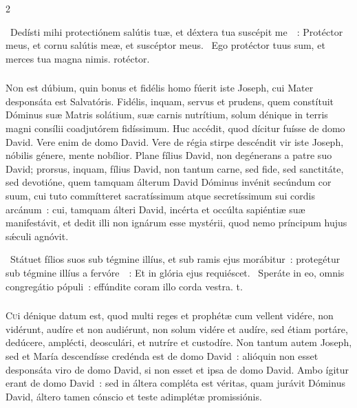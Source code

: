 \documentclass[9pt,twoside]{extarticle}
\begin{document}
\begin{multicols}{2}
{{\begin{tightlist}{}
\item {}~Dedísti mihi protectiónem salútis tuæ, et déxtera tua suscépit me~~: \textred{*} Protéctor meus, et cornu salútis meæ, et suscéptor meus. ~Ego protéctor tuus sum, et merces tua magna nimis. rotéctor.
\end{tightlist}

\subsubsection*{\center {}}
\lettrine{N}on est dúbium, quin bonus et fidélis homo fúerit iste Joseph, cui Mater desponsáta est Salvatóris. Fidélis, inquam, servus et prudens, quem constítuit Dóminus suæ Matris solátium, suæ carnis nutrítium, solum dénique in terris magni consílii coadjutórem fidíssimum. Huc accédit, quod dícitur fuísse de domo David. Vere enim de domo David. Vere de régia stirpe descéndit vir iste Joseph, nóbilis génere, mente nobílior. Plane fílius David, non degénerans a patre suo David; prorsus, inquam, fílius David, non tantum carne, sed fide, sed sanctitáte, sed devotióne, quem tamquam álterum David Dóminus invénit secúndum cor suum, cui tuto commítteret sacratíssimum atque secretíssimum sui cordis arcánum~: cui, tamquam álteri David, incérta et occúlta sapiéntiæ suæ manifestávit, et dedit illi non ignárum esse mystérii, quod nemo príncipum hujus sǽculi agnóvit.

\begin{tightlist}{}
\item {}~Státuet fílios suos sub tégmine illíus, et sub ramis ejus morábitur~: protegétur sub tégmine illíus a fervóre~~: \textred{*} Et in glória ejus requiéscet. ~Speráte in eo, omnis congregátio pópuli~: effúndite coram illo corda vestra. t.
\end{tightlist}

\subsubsection*{\center {}}
\lettrine{C}ui dénique datum est, quod multi reges et prophétæ cum vellent vidére, non vidérunt, audíre et non audiérunt, non solum vidére et audíre, sed étiam portáre, dedúcere, amplécti, deosculári, et nutríre et custodíre. Non tantum autem Joseph, sed et María descendísse credénda est de domo David~: alióquin non esset desponsáta viro de domo David, si non esset et ipsa de domo David. Ambo ígitur erant de domo David~: sed in áltera compléta est véritas, quam jurávit Dóminus David, áltero tamen cónscio et teste adimplétæ promissiónis.

}}
\end{multicols}
\end{document}
